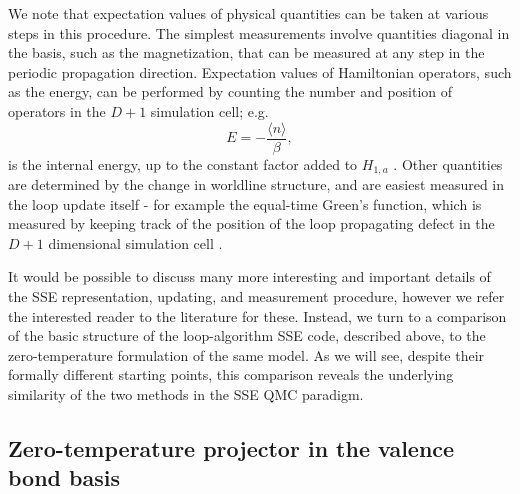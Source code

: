 \documentclass[vecphys]{svmult}
\begin{document}
We note that expectation values of physical quantities can be taken at various steps in this procedure.  The simplest measurements involve quantities diagonal in the basis, such as the magnetization, that can be measured at any step in the periodic propagation direction.  Expectation values of Hamiltonian operators, such as the energy, can be performed by counting the number and position of operators in the $D+1$ simulation cell; e.g.
\begin{equation}
E = - \frac{\langle n \rangle}{\beta},
\end{equation}
is the internal energy, up to the constant factor added to $H_{1,a}$  \cite{Melko:Sandvik99}.
Other quantities are determined by the change in worldline structure, and are easiest measured in the loop update itself - for example the equal-time Green's function, which is measured by keeping track of the position of the loop propagating defect in the $D+1$ dimensional simulation cell \cite{Melko:WormA,Melko:gfsse,Melko:Assaad07}. 

It would be possible to discuss many more interesting and important details of the SSE representation, updating, and measurement procedure, however we refer the interested reader to the literature for these.  Instead, we turn to a comparison of the basic structure of the loop-algorithm SSE code, described above, to the zero-temperature formulation of the same model.  As we will see, despite their formally different starting points, this comparison reveals the underlying similarity of the two methods in the SSE QMC paradigm.

\subsection{Zero-temperature projector in the valence bond basis} \label{Melko:VBB}
\end{document}
